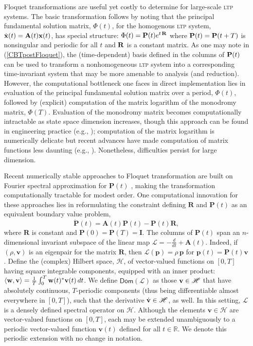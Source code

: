 \documentclass[pdflatex,sn-mathphys-num]{sn-jnl}%
\theoremstyle{thmstyleone}%
\theoremstyle{thmstyletwo}%
\theoremstyle{thmstylethree}%
\def\Bv{{\bf v}}  \def\BV{{\bf V}}
\def\Bw{{\bf w}}  \def\BW{{\bf W}}
\begin{document}
Floquet transformations are useful yet costly to determine for large-scale \textsc{ltp}  systems.  
The basic transformation follows by noting that the principal fundamental solution matrix, $\Phi(t)$, 
for the homogenous \textsc{ltp} system, $ \dot{\bf x}(t) = {\bf A}(t) {\bf x}(t)$, has special structure:
$\Phi(t) = {\bf P}(t) e^{t\,{\bf R}} $
where ${\bf P}(t) = {\bf P}(t+T)$ is nonsingular and periodic for all $t$ and ${\bf R}$ is a constant
matrix.
As one may note in (\ref{CBTpostFloquet}), the (time-dependent) basis defined in the columns of ${\bf P}(t)$ 
can be used to transform a nonhomogeneous \textsc{ltp} system into a corresponding time-invariant system that may be more amenable to 
analysis (and reduction).   However, the computational bottleneck one faces in direct implementation lies in evaluation of the principal fundamental solution matrix over a period, $\Phi(t)$, followed by (explicit) computation of the matrix logarithm of the monodromy matrix, $\Phi(T)$.  Evaluation of the monodromy matrix becomes computationally intractable as state space dimension increases, though this approach can be found in engineering practice (e.g., \cite{wangHale2001OnMonodromyComp}); computation of the matrix logarithm is numerically delicate but recent advances have made computation of matrix functions less daunting (e.g., \cite{highamAlMohy2010compMatrixFunc,HaleHighamTref2008CompfAbyContInt}).   Nonetheless, difficulties persist for large dimension. 

Recent numerically stable approaches to Floquet transformation are built on Fourier spectral approximation for $\mathbf{P}(t)$ \cite{mooreFloquetTheoryComputational2005}, making the transformation computationally tractable for modest order. One computational innovation for these approaches lies in reformulating the constraint defining $\mathbf{R}$ and $\mathbf{P}(t)$ as an equivalent boundary value problem, 
\begin{equation} \label{FloqBVP}
\dot{\mathbf{P}}(t) = \mathbf{A}(t)\mathbf{P}(t) -\mathbf{P}(t)\mathbf{R},
\end{equation}
where $\mathbf{R}$ is constant and $\mathbf{P}(0)=\mathbf{P}(T)=\mathbf{I}$.  The columns of $\mathbf{P}(t)$ span an 
$n$-dimensional invariant subspace of the linear map $\mathscr{L}=-\frac{d}{dt}+\mathbf{A}(t)$.  Indeed, if 
$(\rho,\mathbf{v})$ is an eigenpair for the matrix $\mathbf{R}$, then $\mathscr{L}(\mathbf{p})=\rho \, \mathbf{p}$ for $\mathbf{p}(t)= \mathbf{P}(t) \mathbf{v}$.   
Define the 
(complex) Hilbert space, $\mathscr{H}$, of vector-valued functions on $[0,T]$ having square integrable components, equipped with an inner product: $\langle \Bw, \Bv \rangle =\frac1T \int_0^T \Bw(t)^*\Bv(t)\,dt$. 
We define $\mathsf{Dom}(\mathscr{L})$ as those $\Bv\in\mathscr{H}$ that have absolutely continuous, $T$-periodic components (thus being differentiable almost everywhere in $[0,T]$), such that the derivative $\dot{\Bv}\in\mathscr{H}$, as well.  In this setting, $\mathscr{L}$ is a densely defined spectral operator on $\mathscr{H}$.  Although the elements $\mathbf{v}\in\mathscr{H}$ are vector-valued functions on $[0,T]$, each may be extended unambiguously to a periodic vector-valued function $\mathbf{v}(t)$ defined for all $t\in\mathbb{R}$. We denote this periodic extension with no change in notation. 
\end{document}
